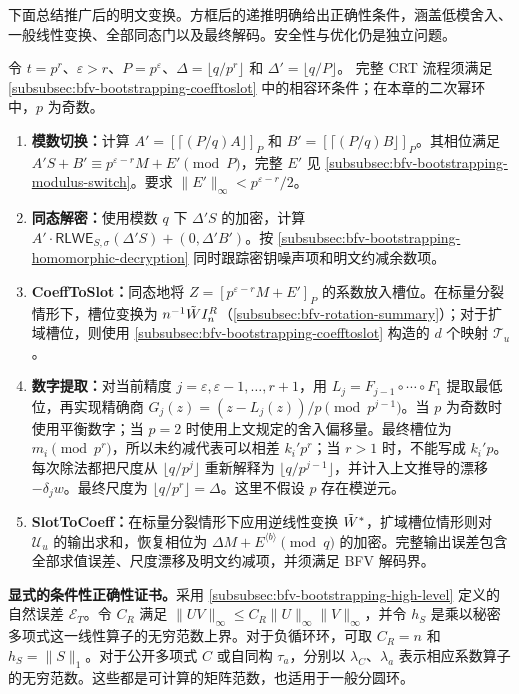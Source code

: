 下面总结推广后的明文变换。方框后的递推明确给出正确性条件，涵盖低模舍入、一般线性变换、全部同态门以及最终解码。安全性与优化仍是独立问题。

\begin{tcolorbox}[title={\textbf{\tboxlabel{\ref*{subsubsec:bfv-bootstrapping-summary}} BFV 自举}}]
令 $t=p^r$、$\varepsilon>r$、$P=p^\varepsilon$、$\Delta=\lfloor q/p^r\rfloor$ 和 $\Delta'=\lfloor q/P\rfloor$。 完整 CRT 流程须满足 \autoref{subsubsec:bfv-bootstrapping-coefftoslot} 中的相容环条件；在本章的二次幂环中，$p$ 为奇数。
\begin{enumerate}
\item \textbf{模数切换：}计算 $A'=[\lceil(P/q)A\rfloor]_P$ 和 $B'=[\lceil(P/q)B\rfloor]_P$。其相位满足 $A'S+B'\equiv p^{\varepsilon-r}M+E'\pmod P$，完整 $E'$ 见 \autoref{subsubsec:bfv-bootstrapping-modulus-switch}。要求 $\|E'\|_\infty<p^{\varepsilon-r}/2$。
\item \textbf{同态解密：}使用模数 $q$ 下 $\Delta'S$ 的加密，计算 $A'\cdot\textsf{RLWE}_{S,\sigma}(\Delta'S)+(0,\Delta'B')$。按 \autoref{subsubsec:bfv-bootstrapping-homomorphic-decryption} 同时跟踪密钥噪声项和明文约减余数项。
\item \textbf{\textsf{CoeffToSlot}：}同态地将 $Z=[p^{\varepsilon-r}M+E']_P$ 的系数放入槽位。在标量分裂情形下，槽位变换为 $n^{-1}\tilde W I_n^R$（\autoref{subsubsec:bfv-rotation-summary}）；对于扩域槽位，则使用 \autoref{subsubsec:bfv-bootstrapping-coefftoslot} 构造的 $d$ 个映射 $\mathcal T_u$。
\item \textbf{数字提取：}对当前精度 $j=\varepsilon,\varepsilon-1,\ldots,r+1$，用 $L_j=F_{j-1}\circ\cdots\circ F_1$ 提取最低位，再实现精确商 $G_j(z)=(z-L_j(z))/p\pmod{p^{j-1}}$。当 $p$ 为奇数时使用平衡数字；当 $p=2$ 时使用上文规定的舍入偏移量。最终槽位为 $m_i\pmod{p^r}$，所以未约减代表可以相差 $k_i'p^r$；当 $r>1$ 时，不能写成 $k_i'p$。
每次除法都把尺度从 $\lfloor q/p^j\rfloor$ 重新解释为 $\lfloor q/p^{j-1}\rfloor$，并计入上文推导的漂移 $-\delta_jw$。最终尺度为 $\lfloor q/p^r\rfloor=\Delta$。这里不假设 $p$ 存在模逆元。
\item \textbf{\textsf{SlotToCoeff}：}在标量分裂情形下应用逆线性变换 $\tilde W^*$，扩域槽位情形则对 $\mathcal U_u$ 的输出求和，恢复相位为 $\Delta M+E^{\langle b\rangle}\pmod q$ 的加密。完整输出误差包含全部求值误差、尺度漂移及明文约减项，并须满足 BFV 解码界。
\end{enumerate}
\end{tcolorbox}

\textbf{显式的条件性正确性证书。}采用 \autoref{subsubsec:bfv-bootstrapping-high-level} 定义的自然误差 $\mathcal E_T$。令 $C_R$ 满足 $\|UV\|_\infty\leq C_R\|U\|_\infty\|V\|_\infty$，并令 $h_S$ 是乘以秘密多项式这一线性算子的无穷范数上界。对于负循环环，可取 $C_R=n$ 和 $h_S=\|S\|_1$。对于公开多项式 $C$ 或自同构 $\tau_a$，分别以 $\lambda_C$、$\lambda_a$ 表示相应系数算子的无穷范数。这些都是可计算的矩阵范数，也适用于一般分圆环。

